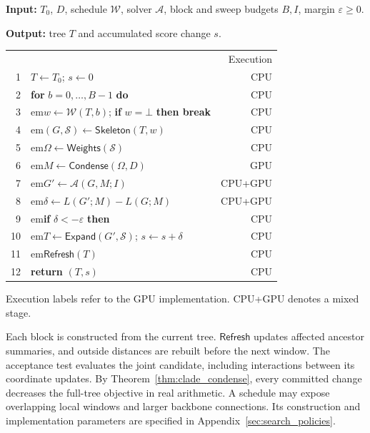 \documentclass[11pt,a4paper]{article}
\makeatletter
\newcommand{\algindent}[1]{\hangindent=#1em\hangafter=1\hspace*{#1em}}
\newcommand{\proc}[1]{\mathsf{#1}}
\newcommand{\onCPU}{{\footnotesize\sffamily\color{black!70}CPU}}
\newcommand{\onGPU}{{\footnotesize\sffamily\color{gpuColour}GPU}}
\newcommand{\onBoth}{{\footnotesize\sffamily\color{black!70}CPU+\textcolor{gpuColour}{GPU}}}
\DeclareRobustCommand{\_}{\ifmmode\nfss@text{\textunderscore}\else\textunderscore\allowbreak\fi}
\theoremstyle{definition}
\makeatother
\begin{document}
\begin{algorithm}[!htbp]
\caption{Full-tree and minibatch BME search}
\label{alg:block_search}
\small
\textbf{Input:} $T_0$, $D$, schedule $\mathcal W$, solver $\mathcal A$, block and sweep budgets $B,I$, margin $\varepsilon\geq0$.\par
\textbf{Output:} tree $T$ and accumulated score change $s$.\par\smallskip
\begin{tabular*}{\linewidth}{@{}r@{\quad}>{\raggedright\arraybackslash}p{.74\linewidth}@{\extracolsep{\fill}}r@{}}
  & & \textsf{Execution}\\
1 & $T\gets T_0$; $s\gets0$ & \onCPU\\
2 & \textbf{for} $b=0,\ldots,B-1$ \textbf{do} & \onCPU\\
3 & \algindent{1}$w\gets\mathcal W(T,b)$; \textbf{if} $w=\bot$ \textbf{then break} & \onCPU\\
4 & \algindent{1}$(G,\mathcal S)\gets\proc{Skeleton}(T,w)$ & \onCPU\\
5 & \algindent{1}$\Omega\gets\proc{Weights}(\mathcal S)$ & \onCPU\\
6 & \algindent{1}$M\gets\proc{Condense}(\Omega,D)$ & \onGPU\\
7 & \algindent{1}$G'\gets\mathcal A(G,M;I)$ & \onBoth\\
8 & \algindent{1}$\delta\gets L(G';M)-L(G;M)$ & \onBoth\\
9 & \algindent{1}\textbf{if} $\delta<-\varepsilon$ \textbf{then} & \onCPU\\
10 & \algindent{2}$T\gets\proc{Expand}(G',\mathcal S)$; $s\gets s+\delta$ & \onCPU\\
11 & \algindent{2}$\proc{Refresh}(T)$ & \onCPU\\
12 & \textbf{return} $(T,s)$ & \onCPU\\
\end{tabular*}
\par\smallskip
{\footnotesize Execution labels refer to the GPU implementation. \onBoth{} denotes a mixed stage.}
\end{algorithm}

Each block is constructed from the current tree.
$\proc{Refresh}$ updates affected ancestor summaries, and outside distances are rebuilt before the next window.
The acceptance test evaluates the joint candidate, including interactions between its coordinate updates.
By Theorem~\ref{thm:clade_condense}, every committed change decreases the full-tree objective in real arithmetic.
A schedule may expose overlapping local windows and larger backbone connections. Its construction and implementation parameters are specified in Appendix~\ref{sec:search_policies}.
\end{document}
